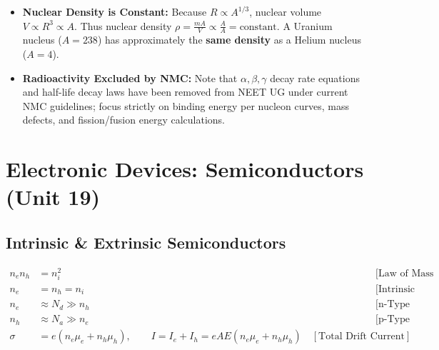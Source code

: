 \documentclass[11pt,a4paper]{article}
\begin{document}
\begin{trapbox}
\begin{itemize}
  \item \textbf{Nuclear Density is Constant:} Because $R \propto A^{1/3}$, nuclear volume $V \propto R^3 \propto A$. Thus nuclear density $\rho = \frac{m A}{V} \propto \frac{A}{A} = \text{constant}$. A Uranium nucleus ($A=238$) has approximately the \textbf{same density} as a Helium nucleus ($A=4$).
  \item \textbf{Radioactivity Excluded by NMC:} Note that $\alpha, \beta, \gamma$ decay rate equations and half-life decay laws have been removed from NEET UG under current NMC guidelines; focus strictly on binding energy per nucleon curves, mass defects, and fission/fusion energy calculations.
\end{itemize}
\end{trapbox}

\newpage

\section{Electronic Devices: Semiconductors (Unit 19)}

\subsection{Intrinsic \& Extrinsic Semiconductors}

\begin{formulabox}
\begin{align}
  n_e n_h &= n_i^2 && \text{[Law of Mass Action: valid for both intrinsic and extrinsic]} \\
  n_e &= n_h = n_i && \text{[Intrinsic Semiconductor]} \\
  n_e &\approx N_d \gg n_h && \text{[n-Type Semiconductor: Pentavalent Donor Doping (P, As, Sb)]} \\
  n_h &\approx N_a \gg n_e && \text{[p-Type Semiconductor: Trivalent Acceptor Doping (B, Al, In)]} \\
  \sigma &= e(n_e \mu_e + n_h \mu_h), \qquad I = I_e + I_h = e A E(n_e \mu_e + n_h \mu_h) \quad [\text{Total Drift Current}]
\end{align}
\end{formulabox}
\end{document}
